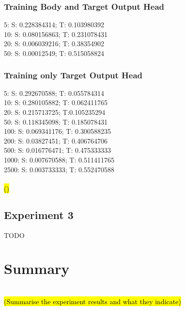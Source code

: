 \documentclass{report}
\newcommand{\TODO}[1]{\sethlcolor{pink}\hl{\\(#1)\\}}
\begin{document}
	\subsubsection{Training Body and Target Output Head}
	5: S: 0.228384314; T: 0.103980392\\
	10: S: 0.080156863; T: 0.231078431\\
	20: S: 0.006039216; T: 0.38354902\\
	50: S: 0.00012549; T: 0.515058824\\
	
	\subsubsection{Training only Target Output Head}
	5: S: 0.292670588; T: 0.055784314\\
	10: S: 0.280105882; T: 0.062411765\\
	20: S: 0.215713725; T:0.105235294\\
	50: S: 0.118345098; T: 0.185078431\\
	100: S: 0.069341176; T: 0.300588235\\
	200: S: 0.03827451; T: 0.406764706\\
	500: S: 0.016776471; T: 0.475333333\\
	1000: S: 0.007670588; T: 0.511411765\\
	2500: S: 0.003733333; T: 0.552470588\\
	\TODO{}
	\subsection{Experiment 3}
	TODO{}
		
	\section{Summary}
	\TODO{Summarise the experiment results and what they indicate}
	
	
\end{document}
